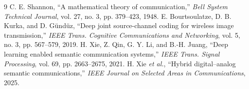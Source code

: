 \documentclass[conference]{IEEEtran}
\begin{document}
\balance
\begin{thebibliography}{9}
C. E. Shannon, ``A mathematical theory of communication,'' \emph{Bell System Technical Journal}, vol. 27, no. 3, pp. 379--423, 1948.
E. Bourtsoulatze, D. B. Kurka, and D. G\"und\"uz, ``Deep joint source-channel coding for wireless image transmission,'' \emph{IEEE Trans. Cognitive Communications and Networking}, vol. 5, no. 3, pp. 567--579, 2019.
H. Xie, Z. Qin, G. Y. Li, and B.-H. Juang, ``Deep learning enabled semantic communication systems,'' \emph{IEEE Trans. Signal Processing}, vol. 69, pp. 2663--2675, 2021.
H. Xie \emph{et al.}, ``Hybrid digital--analog semantic communications,'' \emph{IEEE Journal on Selected Areas in Communications}, 2025.
\end{thebibliography}
\end{document}
